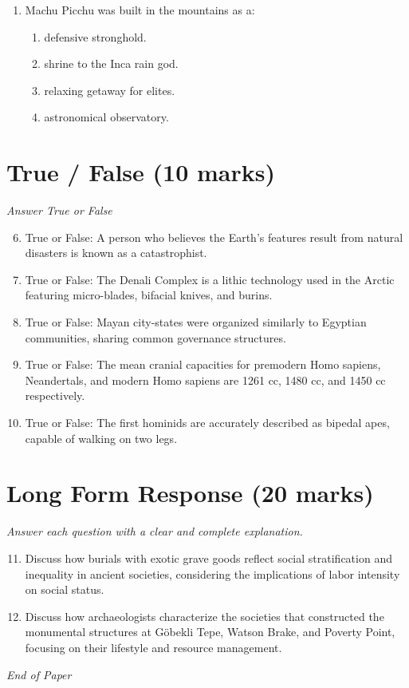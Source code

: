 \documentclass[12pt]{article}
\begin{document}
\begin{enumerate}[label=\arabic*.]
\begin{enumerate}[label=(\alph*)]
    \item multicultural adaptation.
    \item multilineal evolution.
\end{enumerate}
\item Machu Picchu was built in the mountains as a:
\begin{enumerate}[label=(\alph*)]
    \item defensive stronghold.
    \item shrine to the Inca rain god.
    \item relaxing getaway for elites.
    \item astronomical observatory.
\end{enumerate}
\end{enumerate}

\section*{True / False (10 marks)}
\textit{Answer True or False}
\begin{enumerate}[label=\arabic*.]
\setcounter{enumi}{5}
\item True or False: A person who believes the Earth's features result from natural disasters is known as a catastrophist.
\item True or False: The Denali Complex is a lithic technology used in the Arctic featuring micro-blades, bifacial knives, and burins.
\item True or False: Mayan city-states were organized similarly to Egyptian communities, sharing common governance structures.
\item True or False: The mean cranial capacities for premodern Homo sapiens, Neandertals, and modern Homo sapiens are 1261 cc, 1480 cc, and 1450 cc respectively.
\item True or False: The first hominids are accurately described as bipedal apes, capable of walking on two legs.
\end{enumerate}

\section*{Long Form Response (20 marks)}
\textit{Answer each question with a clear and complete explanation.}
\begin{enumerate}[label=\arabic*.]
\setcounter{enumi}{10}
\item Discuss how burials with exotic grave goods reflect social stratification and inequality in ancient societies, considering the implications of labor intensity on social status.
\item Discuss how archaeologists characterize the societies that constructed the monumental structures at Göbekli Tepe, Watson Brake, and Poverty Point, focusing on their lifestyle and resource management.
\end{enumerate}

\vfill
\noindent\textit{End of Paper}
\end{document}
